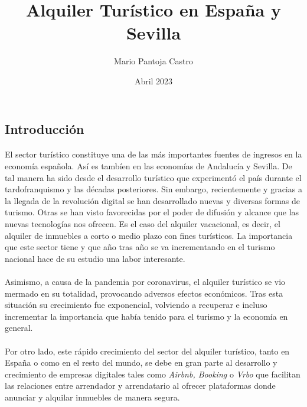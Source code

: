\documentclass[a4paper,10pt]{article}
\title{Alquiler Turístico en España y Sevilla}
\author{Mario Pantoja Castro}
\date{Abril 2023}
\begin{document}
    \maketitle

    \begin{abstract}
       
    \end{abstract}

    \vspace{3mm}

    \setlength{\columnsep}{0.88cm}
    \begin{multicols}{2}
    
        \section{Introducción}

            \paragraph*{}
            El sector turístico constituye una de las más importantes fuentes de ingresos en la economía española. Así es tambíen en las economías de Andalucía y
            Sevilla. De tal manera ha sido desde el desarrollo turístico que experimentó el país durante el tardofranquismo y las décadas posteriores. Sin embargo, 
            recientemente y gracias a la llegada de la revolución digital se han desarrollado nuevas y diversas formas de turismo. Otras se han visto favorecidas
            por el poder de difusión y alcance que las nuevas tecnologías nos ofrecen. Es el caso del alquiler vacacional, es decir, el alquiler de inmuebles a
            corto o medio plazo con fines turísticos. La importancia que este sector tiene y que año tras año se va incrementando en el turismo nacional hace de 
            su estudio una labor interesante.
            
            \paragraph*{}
            Asimismo, a causa de la pandemia por coronavirus, el alquiler turístico se vio mermado en su totalidad, 
            provocando adversos efectos económicos. Tras esta situación su crecimiento fue exponencial, volviendo a recuperar e incluso incrementar la importancia
            que había tenido para el turismo y la economía en general.

            \paragraph*{}
            Por otro lado, este rápido crecimiento del sector del alquiler turístico, tanto en España o como en el resto del mundo, se debe en gran parte al 
            desarrollo y crecimiento de empresas digitales tales como \textit{Airbnb, Booking} o \textit{Vrbo} que facilitan las relaciones entre
            arrendador y arrendatario al ofrecer plataformas donde anunciar y alquilar inmuebles de manera segura.


\end{multicols}
\end{document}
